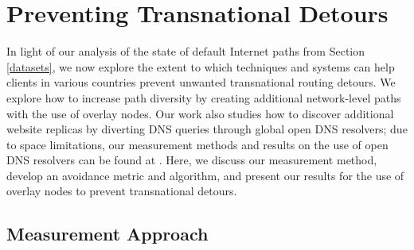 \section{Preventing Transnational Detours}
\label{avoid_results}

In light of our analysis of the state of default Internet paths from
Section \ref{datasets}, we now explore the extent to which
techniques and systems can help clients in various countries prevent
unwanted transnational routing detours. We explore how to increase path 
diversity by creating 
additional network-level paths with the use of overlay nodes.  Our work also 
studies how to discover additional website
replicas by diverting DNS queries through global open DNS resolvers; due 
to space limitations, our 
measurement methods and results on the use of open DNS resolvers can 
be found at \cite{characterizing_detours}.
Here, we discuss our measurement method, develop an avoidance metric and
algorithm, and present our results for the use of overlay nodes to prevent 
transnational detours.

\subsection{Measurement Approach}
\label{avoid_pipelines}



